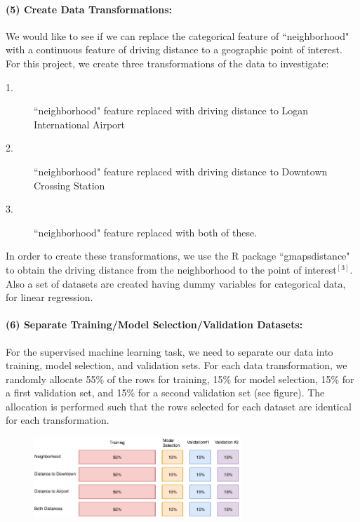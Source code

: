 \documentclass[11pt]{article}
\begin{document}
             \paragraph{(5) Create Data Transformations:}
             	We would like to see if we can replace the categorical feature of ``neighborhood" with a continuous feature of driving distance to a geographic point of interest. For this project, we create three transformations of the data to investigate:    
                \begin{description}
                	\item[1.] ``neighborhood" feature replaced with driving distance to Logan International Airport
                    \item[2.] ``neighborhood" feature replaced with driving distance to Downtown Crossing Station
                    \item[3.]  ``neighborhood" feature replaced with both of these. 
                \end{description}
	In order to create these transformations, we use the R package ``gmapsdistance" to obtain the driving distance from the neighborhood to the point of interest$^{[3]}$. Also a set of datasets are created having dummy variables for categorical data, for linear regression.
             
             
             \paragraph{(6) Separate Training/Model Selection/Validation Datasets:}
             	For the supervised machine learning task, we need to separate our data into training, model selection, and validation sets. For each data transformation, we randomly allocate 55\% of the rows for training, 15\% for model selection, 15\% for a first validation set, and 15\% for a second validation set (see figure). The allocation is performed such that the rows selected for each dataset are identical for each transformation.
                
              		\begin{figure}[H]
            			\centering
                  		\includegraphics[width=0.7\textwidth]{data_separation.png}
            		\end{figure}
             
\end{document}
